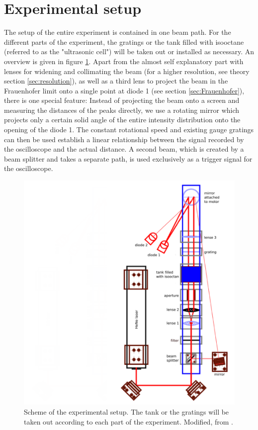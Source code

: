 \section{Experimental setup}
The setup of the entire experiment is contained in one beam path. 
For the different parts of the experiment, the gratings or the tank 
filled with isooctane (referred to as the "ultrasonic cell") will be 
taken out or installed as necessary. An overview is given in figure \ref{fig:setup}.
Apart from the almost self explanatory part with lenses for widening and 
collimating the beam (for a higher resolution, see theory section \ref{sec:resolution}), 
as well as a third lens to project the beam in the Frauenhofer limit 
onto a single point at diode 1 (see section \ref{sec:Frauenhofer}), 
there is one special feature: Instead of projecting the beam onto a screen and 
measuring the distances of the peaks directly, we use a rotating mirror which 
projects only a certain solid angle of the entire intensity distribution onto 
the opening of the diode 1. The constant rotational speed and existing gauge gratings 
can then be used establish a linear relationship between the signal recorded by the 
oscilloscope and the actual distance. A second beam, which is created by a beam splitter and 
takes a separate path, is used exclusively as a trigger signal for the oscilloscope.

\begin{figure}
    \centering
    \includegraphics[width=1.0\textwidth]{figures/setup_bitmap.png}
    \caption{
        Scheme of the experimental setup. The tank or the gratings will be taken out 
        according to each part of the experiment.
        Modified, from \cite{ver}.
        }
    \label{fig:setup}
\end{figure}
\FloatBarrier
